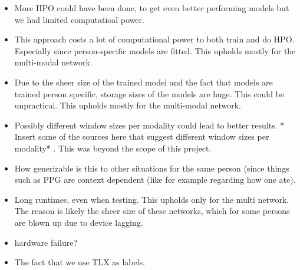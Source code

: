 \documentclass[12pt]{article}
\begin{document}
\begin{itemize}
  \item  More HPO could have been done, to get even better performing models but we had limited computatioal power.   
  \item This approach costs a lot of computational power to both train and do HPO. Especially since person-specific models are fitted. This upholds mostly for the multi-modal network.
  \item Due to the sheer size of the trained model and the fact that models are trained person specific, storage sizes of the models are huge. This could be unpractical.  This upholds mostly for the multi-modal network.
  \item Possibly different window sizes per modality could lead to better results.  * Insert some of the sources here that suggest different window sizes per modality* . This was beyond the scope of this project.
   \item How generizable is this to other situations for the same person (since things such as PPG are context dependent (like for example regarding how one ate).
   \item Long runtimes,  even when testing. This upholds only for the multi network. The reason is likely the sheer size of these networks, which for some persons are blown up due to device lagging. 
   \item hardware failure?
   \item The fact that we use TLX as labels.
\end{itemize}





\newpage


\end{document}
